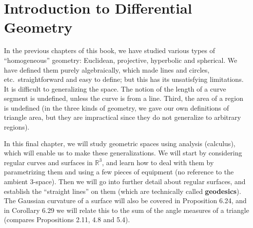 \documentclass[leqno]{book}
\begin{document}

\chapter{Introduction to Differential Geometry} %

\noindent %
In the previous chapters of this book, we have studied various types of ``homogeneous'' geometry: Euclidean, projective, hyperbolic and spherical.  We have defined them purely algebraically, which made lines and circles, etc.~straightforward and easy to define; but this has its unsatisfying limitations.  It is difficult to generalizing the space.  The notion of the length of a curve segment is undefined, unless the curve is from a line.  Third, the area of a region is undefined (in the three kinds of geometry, we gave our own definitions of triangle area, but they are impractical since they do not generalize to arbitrary regions).

In this final chapter, we will study geometric spaces using analysis (calculus), which will enable us to make these generalizations.  We will start by considering regular curves and surfaces in $\mathbb R^3$, and learn how to deal with them by parametrizing them and using a few pieces of equipment (no reference to the ambient 3-space).  Then we will go into further detail about regular surfaces, and establish the ``straight lines'' on them (which are technically called \textbf{geodesics}).  The Gaussian curvature of a surface will also be covered in Proposition 6.24, and in Corollary 6.29 we will relate this to the sum of the angle measures of a triangle (compares Propositions 2.11, 4.8 and 5.4). %
\end{document}
